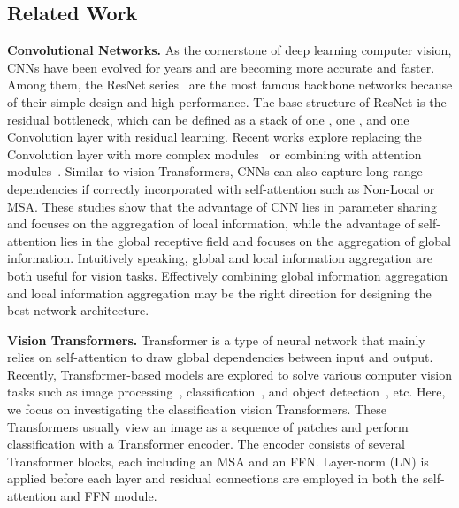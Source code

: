 \documentclass{article}
\begin{document}
\subsection{Related Work}
\label{sec:ret_work}
\textbf{Convolutional Networks.}
As the cornerstone of deep learning computer vision, CNNs have been evolved for years and are becoming more accurate and faster. Among them, the ResNet series~\cite{DBLP:conf/cvpr/HeZRS16,DBLP:conf/cvpr/XieGDTH17,DBLP:journals/corr/abs-2004-08955} are the most famous backbone networks because of their simple design and high performance. The base structure of ResNet is the residual bottleneck, which can be defined as a stack of one , one , and one  Convolution layer with residual learning. Recent works explore replacing the  Convolution layer with more complex modules~\cite{DBLP:journals/corr/abs-2101-11605,DBLP:conf/cvpr/LiW0019} or combining with attention modules~\cite{DBLP:journals/corr/abs-2102-00240,DBLP:journals/corr/abs-1711-07971}. Similar to vision Transformers, CNNs can also capture long-range dependencies if correctly incorporated with self-attention such as Non-Local or MSA. These studies show that the advantage of CNN lies in parameter sharing and focuses on the aggregation of local information, while the advantage of self-attention lies in the global receptive field and focuses on the aggregation of global information. Intuitively speaking, global and local information aggregation are both useful for vision tasks. Effectively combining global information aggregation and local information aggregation may be the right direction for designing the best network architecture.

\textbf{Vision Transformers.}
Transformer is a type of neural network that mainly relies on self-attention to draw global dependencies between input and output. Recently, Transformer-based models are explored to solve various computer vision tasks such as image processing~\cite{DBLP:journals/corr/abs-2012-00364}, classification~\cite{DBLP:journals/corr/abs-2010-11929,DBLP:journals/corr/abs-2010-11929,DBLP:journals/corr/abs-2101-11986}, and object detection~\cite{DBLP:conf/eccv/CarionMSUKZ20,DBLP:journals/corr/abs-2010-04159}, etc. Here, we focus on investigating the classification vision Transformers. These Transformers usually view an image as a sequence of patches and perform classification with a Transformer encoder. The encoder consists of several Transformer blocks, each including an MSA and an FFN. Layer-norm (LN) is applied before each layer and residual connections are employed in both the self-attention and FFN module. 
\end{document}
